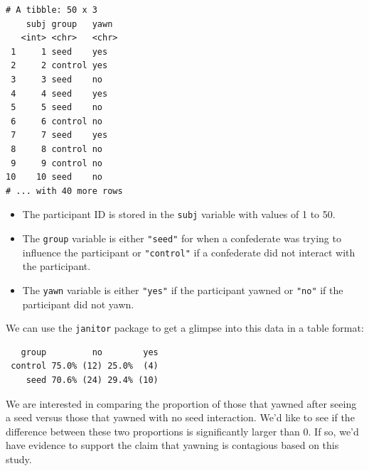\documentclass[12pt, krantz2,]{krantz}
\makeatletter
\newenvironment{Shaded}{\begin{snugshade}}{\end{snugshade}}
\newcommand{\CommentTok}[1]{\textcolor[rgb]{0.37,0.37,0.37}{\textit{#1}}}
\newcommand{\KeywordTok}[1]{\textcolor[rgb]{0.27,0.27,0.27}{\textbf{#1}}}
\newcommand{\NormalTok}[1]{#1}
\newcommand{\OperatorTok}[1]{\textcolor[rgb]{0.43,0.43,0.43}{\textbf{#1}}}
\newcommand{\StringTok}[1]{\textcolor[rgb]{0.5,0.5,0.5}{#1}}
\providecommand{\tightlist}{%
  \setlength{\itemsep}{0pt}\setlength{\parskip}{0pt}}
\newenvironment{kframe}{%
\medskip{}
\setlength{\fboxsep}{.8em}
 \def\at@end@of@kframe{}%
 \ifinner\ifhmode%
  \def\at@end@of@kframe{\end{minipage}}%
  \begin{minipage}{\columnwidth}%
 \fi\fi%
 \def\FrameCommand##1{\hskip\@totalleftmargin \hskip-\fboxsep
 \colorbox{shadecolor}{##1}\hskip-\fboxsep
     \hskip-\linewidth \hskip-\@totalleftmargin \hskip\columnwidth}%
 \MakeFramed {\advance\hsize-\width
   \@totalleftmargin\z@ \linewidth\hsize
   \@setminipage}}%
 {\par\unskip\endMakeFramed%
 \at@end@of@kframe}
\renewenvironment{Shaded}{\begin{kframe}}{\end{kframe}}
\makeatother
\begin{document}
\begin{verbatim}
# A tibble: 50 x 3
    subj group   yawn 
   <int> <chr>   <chr>
 1     1 seed    yes  
 2     2 control yes  
 3     3 seed    no   
 4     4 seed    yes  
 5     5 seed    no   
 6     6 control no   
 7     7 seed    yes  
 8     8 control no   
 9     9 control no   
10    10 seed    no   
# ... with 40 more rows
\end{verbatim}

\begin{itemize}
\tightlist
\item
  The participant ID is stored in the \texttt{subj} variable with values of 1 to 50.
\item
  The \texttt{group} variable is either \texttt{"seed"} for when a confederate was trying to influence the participant or \texttt{"control"} if a confederate did not interact with the participant.
\item
  The \texttt{yawn} variable is either \texttt{"yes"} if the participant yawned or \texttt{"no"} if the participant did not yawn.
\end{itemize}

We can use the \texttt{janitor} package to get a glimpse into this data in a table format:

\begin{Shaded}
\end{Shaded}

\begin{verbatim}
   group         no        yes
 control 75.0% (12) 25.0%  (4)
    seed 70.6% (24) 29.4% (10)
\end{verbatim}

We are interested in comparing the proportion of those that yawned after seeing a seed versus those that yawned with no seed interaction. We'd like to see if the difference between these two proportions is significantly larger than 0. If so, we'd have evidence to support the claim that yawning is contagious based on this study.
\end{document}
